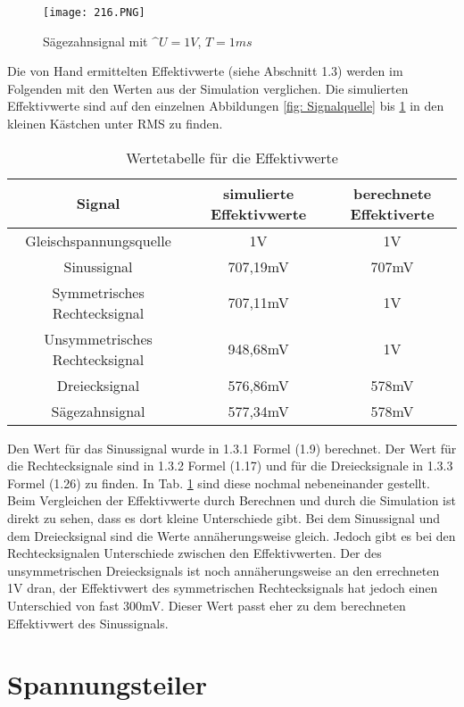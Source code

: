 \begin{figure}[ht!]
\centering
\texttt{[image: 216.PNG]}
\caption{Sägezahnsignal mit $\^{U}=1V$, $T=1ms$}
\label{fig: Sägezahnsignal}
\end{figure}



Die von Hand ermittelten Effektivwerte (siehe Abschnitt 1.3) werden im Folgenden mit den Werten aus der Simulation verglichen. Die simulierten Effektivwerte sind auf den einzelnen Abbildungen \ref{fig: Signalquelle} bis \ref{fig: Sägezahnsignal} in den kleinen Kästchen unter RMS zu finden.
\begin{table}[ht!]
\centering
\caption{Wertetabelle für die Effektivwerte}
\label{fig: Effektivwerte}
\begin{tabular}{|c|c|c|} \hline
Signal & simulierte Effektivwerte & berechnete Effektiverte\\ \hline
Gleischspannungsquelle & 1V & 1V\\ \hline
Sinussignal & 707,19mV & 707mV\\ \hline
Symmetrisches Rechtecksignal & 707,11mV & 1V\\ \hline
Unsymmetrisches Rechtecksignal & 948,68mV & 1V\\ \hline
Dreiecksignal & 576,86mV & 578mV\\ \hline
Sägezahnsignal & 577,34mV & 578mV\\ \hline

\end{tabular}
\end{table}

Den Wert für das Sinussignal wurde in 1.3.1 Formel (1.9) berechnet. Der Wert für die Rechtecksignale sind in 1.3.2 Formel (1.17) und für die Dreiecksignale  in 1.3.3 Formel (1.26) zu finden. In Tab. \ref{fig: Effektivwerte} sind diese nochmal nebeneinander gestellt. Beim Vergleichen der Effektivwerte durch Berechnen und durch die Simulation ist direkt zu sehen, dass es dort kleine Unterschiede gibt. Bei dem Sinussignal und dem Dreiecksignal sind die Werte annäherungsweise gleich. Jedoch gibt es bei den Rechtecksignalen Unterschiede zwischen den Effektivwerten. Der des unsymmetrischen Dreiecksignals ist noch annäherungsweise an den errechneten 1V dran, der Effektivwert des symmetrischen Rechtecksignals hat jedoch einen Unterschied von fast 300mV. Dieser Wert passt eher zu dem berechneten Effektivwert des Sinussignals.

\newpage


\section{Spannungsteiler}
